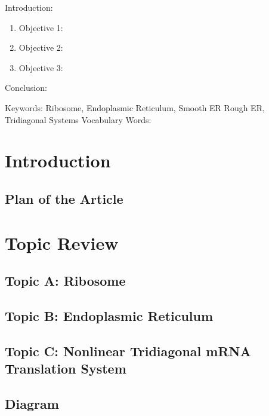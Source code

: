 

\twocolumn
\scriptsize
\begin{frontmatter}
		\title{}
		\author{}
		\address{The Mathematical Learning Space}
\end{frontmatter}	

Introduction:
\begin{enumerate}
\item Objective 1:
\item Objective 2:
\item Objective 3:
\end{enumerate}
Conclusion:

Keywords: Ribosome, Endoplasmic Reticulum, Smooth ER Rough ER, Tridiagonal Systems
Vocabulary Words:

\section{Introduction}

\subsection{Plan of the Article}


\section{Topic Review}

\subsection{Topic A: Ribosome}

\subsection{Topic B: Endoplasmic Reticulum}

\subsection{Topic C: Nonlinear Tridiagonal mRNA Translation System}

\subsection{Diagram}

